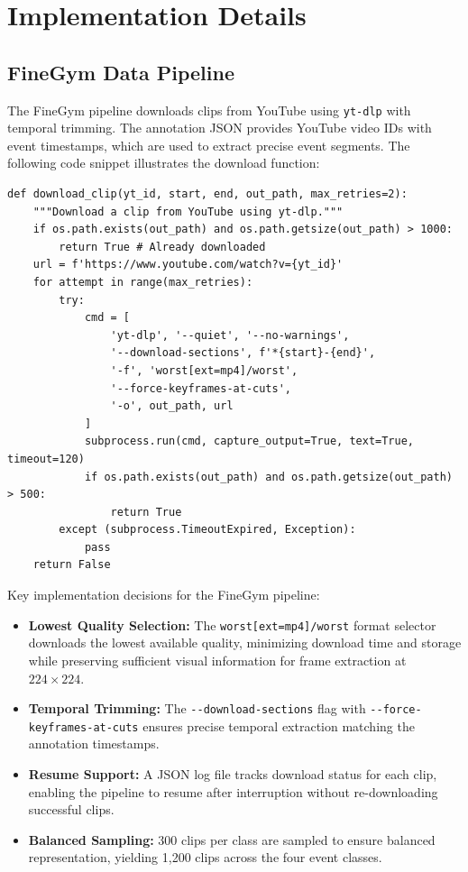 \section{Implementation Details}

\subsection{FineGym Data Pipeline}

The FineGym pipeline downloads clips from YouTube using \texttt{yt-dlp} with temporal trimming. The annotation JSON provides YouTube video IDs with event timestamps, which are used to extract precise event segments. The following code snippet illustrates the download function:

\begin{lstlisting}[caption={FineGym clip download with \texttt{yt-dlp} temporal trimming.}, label={lst:fg_download}]
def download_clip(yt_id, start, end, out_path, max_retries=2):
    """Download a clip from YouTube using yt-dlp."""
    if os.path.exists(out_path) and os.path.getsize(out_path) > 1000:
        return True # Already downloaded
    url = f'https://www.youtube.com/watch?v={yt_id}'
    for attempt in range(max_retries):
        try:
            cmd = [
                'yt-dlp', '--quiet', '--no-warnings',
                '--download-sections', f'*{start}-{end}',
                '-f', 'worst[ext=mp4]/worst',
                '--force-keyframes-at-cuts',
                '-o', out_path, url
            ]
            subprocess.run(cmd, capture_output=True, text=True, timeout=120)
            if os.path.exists(out_path) and os.path.getsize(out_path) > 500:
                return True
        except (subprocess.TimeoutExpired, Exception):
            pass
    return False
\end{lstlisting}

Key implementation decisions for the FineGym pipeline:
\begin{itemize}[leftmargin=*]
    \item \textbf{Lowest Quality Selection:} The \texttt{worst[ext=mp4]/worst} format selector downloads the lowest available quality, minimizing download time and storage while preserving sufficient visual information for frame extraction at $224 \times 224$.
    \item \textbf{Temporal Trimming:} The \nolinkurl{--download-sections} flag with \nolinkurl{--force-keyframes-at-cuts} ensures precise temporal extraction matching the annotation timestamps.
    \item \textbf{Resume Support:} A JSON log file tracks download status for each clip, enabling the pipeline to resume after interruption without re-downloading successful clips.
    \item \textbf{Balanced Sampling:} 300 clips per class are sampled to ensure balanced representation, yielding 1,200 clips across the four event classes.
\end{itemize}

